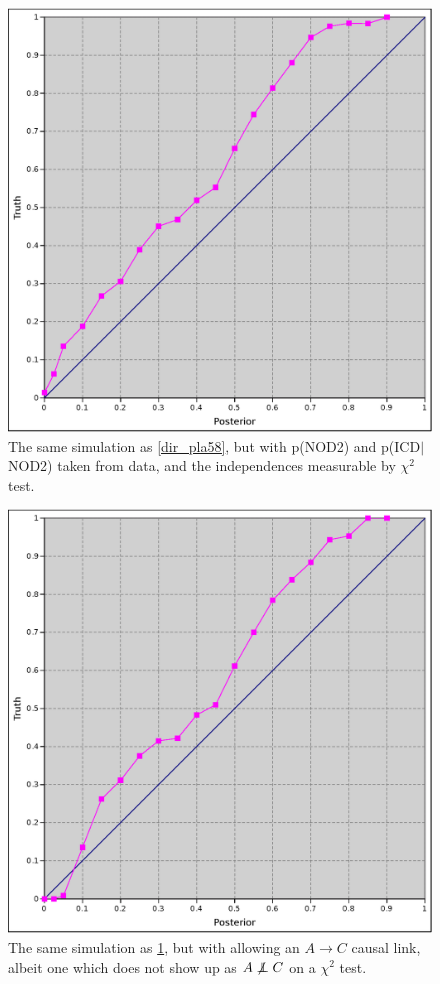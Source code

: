 \documentclass[letterpaper]{article}
\newcommand\indep{\protect\mathpalette{\protect\independenT}{\perp}}
\def\independenT#1#2{\mathrel{\rlap{$#1#2$}\mkern2mu{#1#2}}}
\begin{document}
\begin{figure}
  \includegraphics[width=\textwidth]{direction_crohns_58}
  \caption{The same simulation as \ref{dir_pla58}, but with p(NOD2) and
    p(ICD$|$NOD2) taken from data, and the independences measurable by
    $\chi^2$ test.}
  \label{dir_crohns58}
\end{figure}

\begin{figure}
  \includegraphics[width=\textwidth]{direction_multi_58}
  \caption{The same simulation as \ref{dir_crohns58}, but with
    allowing an $A\rightarrow C$ causal link, albeit one which does
    not show up as $A\not\indep C$ on a $\chi^2$ test.}
  \label{dir_multi58}
\end{figure}
\end{document}
